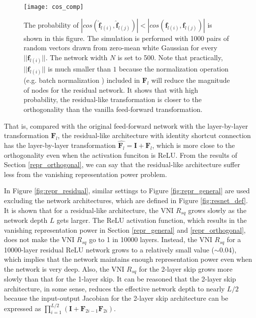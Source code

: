 \begin{figure}[h]
    \centering
    \texttt{[image: cos\_comp]}
    \caption[Numerical simulation for \eqref{res_cosine}]
    {The probability of 
    $|cos(\widehat{\mathbf{f}}_{l(i)}, \widehat{\mathbf{f}}_{l(j)})|<|cos(\mathbf{f}_{l(i)}, \mathbf{f}_{l(j)})|$
    is shown in this figure.
    The simulation is performed with 1000 pairs of random vectors drawn from zero-mean white Gaussian
    for every $||\mathbf{f}_{l(i)}||$.
    The network width $N$ is set to 500.
    Note that practically, $||\mathbf{f}_{l(i)}||$ is much smaller than $1$ because the 
    normalization operation (e.g. batch normalization \cite{batchnorm}) included in $\mathbf{F}_l$
    will reduce the magnitude of nodes for the residual network.
    It shows that with high probability, the residual-like transformation is closer to the
    orthogonality than the vanilla feed-forward transformation.}
    \label{cosine_comp}
\end{figure}

That is, compared with the original feed-forward network with the layer-by-layer transformation
$\mathbf{F}_l$, the residual-like architecture with identity shortcut connection has the
layer-by-layer transformation $\widehat{\mathbf{F}_l}=\mathbf{I}+\mathbf{F}_l$,
which is more close to the orthogonality even when the activation funciton is ReLU.
From the results of Section \ref{repr_orthogonal}, we can say that the residual-like architecture
suffer less from the vanishing representation power problem.

In Figure \ref{fig:repr_residual}, similar settings to Figure \ref{fig:repr_general} are 
used excluding the network architectures, which are defined in Figure \ref{fig:resnet_def}.
It is shown that for a residual-like architecture, the VNI $R_{sq}$ grows slowly as the network
depth $L$ gets larger. The ReLU activation function, which results in the vanishing representation
power in Section \ref{repr_general} and \ref{repr_orthogonal}, does not make the VNI $R_{sq}$ go
to 1 in 10000 layers. Instead, the VNI $R_{sq}$ for a 10000-layer residual ReLU network grows to a
relatively small value ($\sim0.04$), which implies that the network maintains enough representation
power even when the network is very deep.
Also, the VNI $R_{sq}$ for the 2-layer skip grows more slowly than that for the 1-layer skip. It 
can be reasoned that the 2-layer skip architecture, in some sense, reduces the effective network depth
to nearly $L/2$ because the input-output Jacobian for the 2-layer skip architecture can be
expressed as $\prod_{i=1}^{L/2}(\mathbf{I}+\mathbf{F}_{2i-1}\mathbf{F}_{2i})$.

